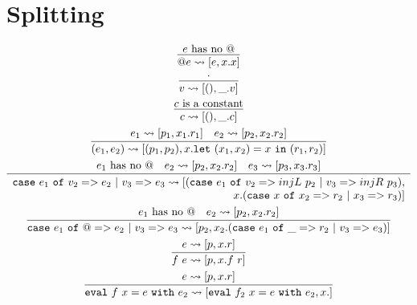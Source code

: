 \documentclass{article}
\begin{document}
\section{Splitting}
\begin{gather}
\infer {@e \rightsquigarrow [e, x.x]}{e \text{ has no @}} \\
\infer {v \rightsquigarrow [(), \_.v]}{\cdot} \\
\infer {c \rightsquigarrow [(), \_.c]}{c \text{ is a constant}} \\
\infer {(e_1,e_2) \rightsquigarrow [(p_1,p_2),x.\mathtt{let}~(x_1,x_2)=x~\mathtt{in}~(r_1,r_2)]}{e_1 \rightsquigarrow [p_1,x_1.r_1] & e_2 \rightsquigarrow [p_2,x_2.r_2]} \\
\infer {
\begin{array}{r}
\mathtt{case}~e_1~\mathtt{of}~v_2=>e_2~|~v_3=>e_3 \rightsquigarrow  [(\mathtt{case}~e_1~\mathtt{of}~v_2=>injL~p_2~|~v_3=>injR~p_3), \\ x.(\mathtt{case}~x~\mathtt{of}~x_2=>r_2~|~x_3=>r_3)]\end{array}
}{e_1 \text{ has no @} & e_2 \rightsquigarrow [p_2,x_2.r_2] & e_3 \rightsquigarrow [p_3,x_3.r_3]} \\
\infer {
\mathtt{case}~e_1~\mathtt{of}~@=>e_2~|~v_3=>e_3 \rightsquigarrow  [p_2,
x_2.(\mathtt{case}~e_1~\mathtt{of}~\_=>r_2~|~v_3=>e_3)] 
}{e_1 \text{ has no @} & e_2 \rightsquigarrow [p_2,x_2.r_2]} \\
\infer {f~e \rightsquigarrow [p,x.f~r]}{e \rightsquigarrow [p,x.r]} \\
\infer {\mathtt{eval}~f~x=e~\mathtt{with}~e_2 \rightsquigarrow [\mathtt{eval}~f_2~x=e~\mathtt{with}~e_2, x.]}{e \rightsquigarrow [p,x.r]} 
\end{gather}
\end{document}
